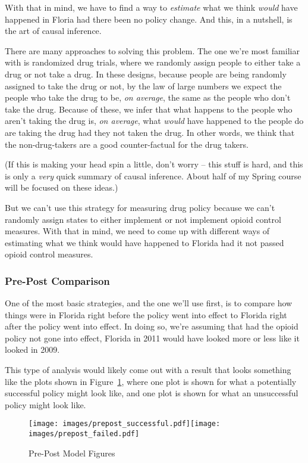 \documentclass[12pt]{article}
\begin{document}
With that in mind, we have to find a way to \emph{estimate} what we think \emph{would} have happened in Floria had there been no policy change. And this, in a nutshell, is the art of causal inference.

There are many approaches to solving this problem. The one we're most familiar with is randomized drug trials, where we randomly assign people to either take a drug or not take a drug. In these designs, because people are being randomly assigned to take the drug or not, by the law of large numbers we expect the people who take the drug to be, \emph{on average}, the same as the people who don't take the drug. Because of these, we infer that what happens to the people who aren't taking the drug is, \emph{on average}, what \emph{would} have happened to the people do are taking the drug had they not taken the drug. In other words, we think that the non-drug-takers are a good counter-factual for the drug takers.

(If this is making your head spin a little, don't worry -- this stuff is hard, and this is only a \emph{very} quick summary of causal inference. About half of my Spring course will be focused on these ideas.)

But we can't use this strategy for measuring drug policy because we can't randomly assign states to either implement or not implement opioid control measures. With that in mind, we need to come up with different ways of estimating what we think would have happened to Florida had it not passed opioid control measures.

\subsubsection*{Pre-Post Comparison}

One of the most basic strategies, and the one we'll use first, is to compare how things were in Florida right before the policy went into effect to Florida right after the policy went into effect. In doing so, we're assuming that had the opioid policy not gone into effect, Florida in 2011 would have looked more or less like it looked in 2009.

This type of analysis would likely come out with a result that looks something like the plots shown in Figure~\ref{figure_prepost_examples}, where one plot is shown for what a potentially successful policy might look like, and one plot is shown for what an unsuccessful policy might look like.

\begin{figure}[h!]
  \centering
  \caption{Pre-Post Model Figures}\label{figure_prepost_examples}
  \texttt{[image: images/prepost\_successful.pdf]}\texttt{[image: images/prepost\_failed.pdf]}
\end{figure}
\pagebreak
\end{document}
